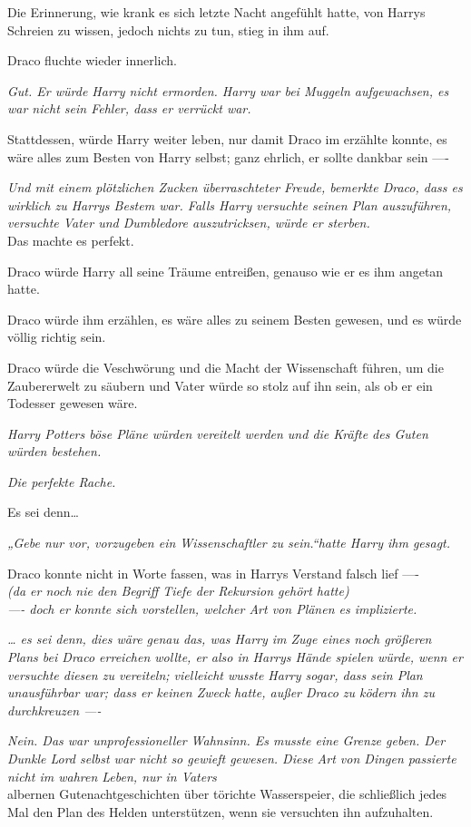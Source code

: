 {Die Erinnerung, wie krank es sich letzte Nacht angefühlt hatte, von Harrys Schreien zu wissen, jedoch nichts zu tun, stieg in ihm auf.

Draco fluchte wieder innerlich.

\emph{Gut. Er würde Harry nicht ermorden. Harry war bei Muggeln aufgewachsen, es war nicht sein Fehler, dass er verrückt war.}

Stattdessen, würde Harry weiter leben, nur damit Draco im erzählte konnte, es wäre alles zum Besten von Harry selbst; ganz ehrlich, er sollte dankbar sein ----

\emph{Und mit einem plötzlichen Zucken überraschteter Freude, bemerkte Draco, dass es wirklich zu Harrys Bestem war. Falls Harry versuchte seinen Plan auszuführen, versuchte Vater und Dumbledore auszutricksen, würde er sterben.}\\ Das machte es perfekt.

Draco würde Harry all seine Träume entreißen, genauso wie er es ihm angetan hatte.

Draco würde ihm erzählen, es wäre alles zu seinem Besten gewesen, und es würde völlig richtig sein.

Draco würde die Veschwörung und die Macht der Wissenschaft führen, um die Zaubererwelt zu säubern und Vater würde so stolz auf ihn sein, als ob er ein Todesser gewesen wäre.

\emph{Harry Potters böse Pläne würden vereitelt werden und die Kräfte des Guten würden bestehen.}

\emph{Die perfekte Rache.}

Es sei denn…

\emph{„Gebe nur vor, vorzugeben ein Wissenschaftler zu sein.“hatte Harry ihm gesagt.}

Draco konnte nicht in Worte fassen, was in Harrys Verstand falsch lief ----\\ \emph{(da er noch nie den Begriff Tiefe der Rekursion gehört hatte)}\\ \emph{---- doch er konnte sich vorstellen, welcher Art von Plänen es implizierte.}

\emph{… es sei denn, dies wäre genau das, was Harry im Zuge eines noch größeren Plans bei Draco erreichen wollte, er also in Harrys Hände spielen würde, wenn er versuchte diesen zu vereiteln; vielleicht wusste Harry sogar, dass sein Plan unausführbar war; dass er keinen Zweck hatte, außer Draco zu ködern ihn zu durchkreuzen ----}

\emph{Nein. Das war unprofessioneller Wahnsinn. Es musste eine Grenze geben. Der Dunkle Lord selbst war nicht so gewieft gewesen. Diese Art von Dingen passierte nicht im wahren Leben, nur in Vaters}\\ albernen Gutenachtgeschichten über törichte Wasserspeier, die schließlich jedes Mal den Plan des Helden unterstützen, wenn sie versuchten ihn aufzuhalten.

}
